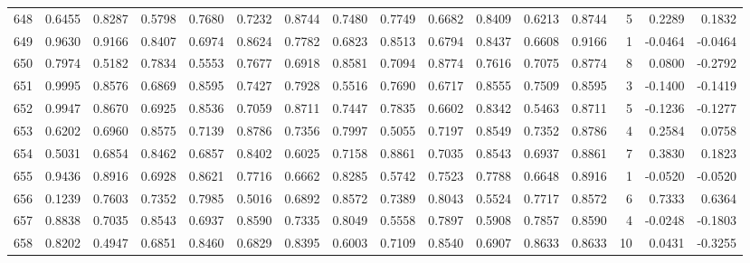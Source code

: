 \begin{tabular}{lrrrrrrrrrrrrrrr}
648 &      0.6455 &  0.8287 &  0.5798 &  0.7680 &  0.7232 &  0.8744 &  0.7480 &  0.7749 &  0.6682 &  0.8409 &   0.6213 &     0.8744 &      5 &                    0.2289 &                     0.1832 \\
649 &      0.9630 &  0.9166 &  0.8407 &  0.6974 &  0.8624 &  0.7782 &  0.6823 &  0.8513 &  0.6794 &  0.8437 &   0.6608 &     0.9166 &      1 &                   -0.0464 &                    -0.0464 \\
650 &      0.7974 &  0.5182 &  0.7834 &  0.5553 &  0.7677 &  0.6918 &  0.8581 &  0.7094 &  0.8774 &  0.7616 &   0.7075 &     0.8774 &      8 &                    0.0800 &                    -0.2792 \\
651 &      0.9995 &  0.8576 &  0.6869 &  0.8595 &  0.7427 &  0.7928 &  0.5516 &  0.7690 &  0.6717 &  0.8555 &   0.7509 &     0.8595 &      3 &                   -0.1400 &                    -0.1419 \\
652 &      0.9947 &  0.8670 &  0.6925 &  0.8536 &  0.7059 &  0.8711 &  0.7447 &  0.7835 &  0.6602 &  0.8342 &   0.5463 &     0.8711 &      5 &                   -0.1236 &                    -0.1277 \\
653 &      0.6202 &  0.6960 &  0.8575 &  0.7139 &  0.8786 &  0.7356 &  0.7997 &  0.5055 &  0.7197 &  0.8549 &   0.7352 &     0.8786 &      4 &                    0.2584 &                     0.0758 \\
654 &      0.5031 &  0.6854 &  0.8462 &  0.6857 &  0.8402 &  0.6025 &  0.7158 &  0.8861 &  0.7035 &  0.8543 &   0.6937 &     0.8861 &      7 &                    0.3830 &                     0.1823 \\
655 &      0.9436 &  0.8916 &  0.6928 &  0.8621 &  0.7716 &  0.6662 &  0.8285 &  0.5742 &  0.7523 &  0.7788 &   0.6648 &     0.8916 &      1 &                   -0.0520 &                    -0.0520 \\
656 &      0.1239 &  0.7603 &  0.7352 &  0.7985 &  0.5016 &  0.6892 &  0.8572 &  0.7389 &  0.8043 &  0.5524 &   0.7717 &     0.8572 &      6 &                    0.7333 &                     0.6364 \\
657 &      0.8838 &  0.7035 &  0.8543 &  0.6937 &  0.8590 &  0.7335 &  0.8049 &  0.5558 &  0.7897 &  0.5908 &   0.7857 &     0.8590 &      4 &                   -0.0248 &                    -0.1803 \\
658 &      0.8202 &  0.4947 &  0.6851 &  0.8460 &  0.6829 &  0.8395 &  0.6003 &  0.7109 &  0.8540 &  0.6907 &   0.8633 &     0.8633 &     10 &                    0.0431 &                    -0.3255 \\

\end{tabular}
